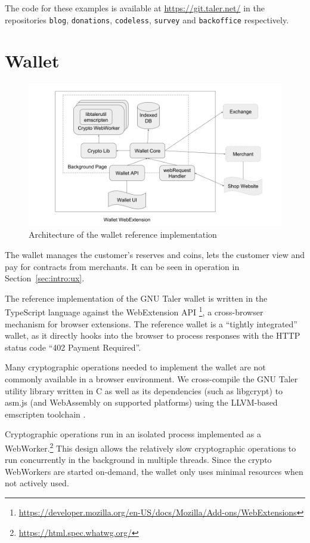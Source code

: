 The code for these examples is available at \url{https://git.taler.net/} in the
repositories \texttt{blog}, \texttt{donations}, \texttt{codeless}, \texttt{survey}
and \texttt{backoffice} respectively.


\section{Wallet}

\begin{figure}
    \includegraphics[width=\textwidth]{diagrams/taler-diagram-wallet.png}
    \caption{Architecture of the wallet reference implementation}
\end{figure}

The wallet manages the customer's reserves and coins, lets the customer view
and pay for contracts from merchants.  It can be seen in operation in
Section~\ref{sec:intro:ux}.

The reference implementation of the GNU Taler wallet is written in the
TypeScript language against the WebExtension API%
\footnote{\url{https://developer.mozilla.org/en-US/docs/Mozilla/Add-ons/WebExtensions}}, a cross-browser mechanism for
browser extensions.  The reference wallet is a ``tightly integrated'' wallet, as it directly hooks into
the browser to process responses with the HTTP status code ``402 Payment Required''.

Many cryptographic operations needed to implement the wallet are not commonly
available in a browser environment.  We cross-compile the GNU Taler utility
library written in C as well as its dependencies (such as libgcrypt) to asm.js
(and WebAssembly on supported platforms) using the LLVM-based emscripten
toolchain \cite{zakai2011emscripten}.

Cryptographic operations run in an isolated process implemented as a
WebWorker.\footnote{\url{https://html.spec.whatwg.org/}}  This design allows
the relatively slow cryptographic operations to run concurrently in the
background in multiple threads.  Since the crypto WebWorkers are started on-demand,
the wallet only uses minimal resources when not actively used.

